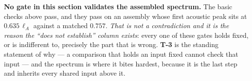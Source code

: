 \noindent
\textbf{No gate in this section validates the assembled spectrum.} The basic
checks above pass, and they pass on an assembly whose first acoustic peak sits
at $0.635\,\ell_A$ against a matched $0.757$. \emph{That is not a
contradiction and it is the reason the ``does not establish'' column exists}:
every one of these gates holds fixed, or is indifferent to, precisely the part
that is wrong. \textbf{T-3} is the standing statement of why --- a comparison
that holds an input fixed cannot check that input --- and the spectrum is where
it bites hardest, because it is the last step and inherits every shared input
above it.
